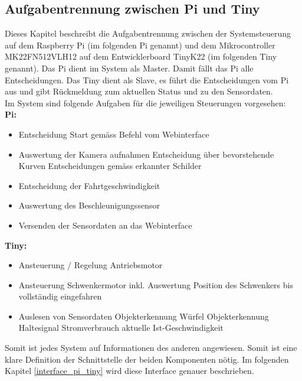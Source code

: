 \documentclass[../../main.tex]{subfiles}
\begin{document}
    \subsection{Aufgabentrennung zwischen Pi und Tiny} \label{aufgabentrennung_pi_tiny}
    Dieses Kapitel beschreibt die Aufgabentrennung zwischen der Systemsteuerung auf dem Raspberry Pi (im folgenden Pi genannt) und dem Mikrocontroller MK22FN512VLH12 auf dem Entwicklerboard TinyK22 (im folgenden Tiny genannt). Das Pi dient im System als Master. Damit fällt das Pi alle Entscheidungen. Das Tiny dient als Slave, es führt die Entscheidungen vom Pi aus und gibt Rückmeldung zum aktuellen Status und zu den Sensordaten.\\
    Im System sind folgende Aufgaben für die jeweiligen Steuerungen vorgesehen:\\
    \textbf{Pi:}
    \begin{itemize}
        \item Entscheidung Start gemäss Befehl vom Webinterface
        \item Auswertung der Kamera aufnahmen
            \subitem Entscheidung über bevorstehende Kurven
            \subitem Entscheidungen gemäss erkannter Schilder 
        \item Entscheidung der Fahrtgeschwindigkeit
        \item Auswertung des Beschleunigungssensor
        \item Versenden der Sensordaten an das Webinterface
    \end{itemize}

    \textbf{Tiny:}
    \begin{itemize}
        \item Ansteuerung / Regelung Antriebsmotor
        \item Ansteuerung Schwenkermotor
            \subitem inkl. Auswertung Position des Schwenkers bis vollständig eingefahren
        \item Auslesen von Sensordaten
            \subitem Objekterkennung Würfel
            \subitem Objekterkennung Haltesignal
            \subitem Stromverbrauch
            \subitem aktuelle Ist-Geschwindigkeit
    \end{itemize}

    Somit ist jedes System auf Informationen des anderen angewiesen. Somit ist eine klare Definition der Schnittstelle der beiden Komponenten nötig. Im folgenden Kapitel \ref{interface_pi_tiny} wird diese Interface genauer beschrieben.
    
\end{document}
